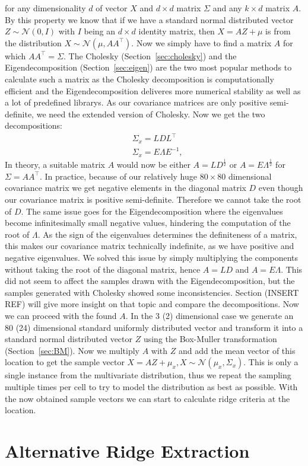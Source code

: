 \noindent for any dimensionality $d$ of vector $X$ and $d \times d$
matrix $\Sigma$ and any $k \times d$ matrix $A$. By this property we
know that if we have a standard normal distributed vector $Z \sim
\mathcal{N}(0,I)$ with $I$ being an $d \times d$ identity matrix, then
$X = AZ + \mu$ is from the distribution $X \sim \mathcal{N}(\mu, A
A^\top)$. Now we simply have to find a matrix $A$ for which $AA^\top =
\Sigma$. The Cholesky (Section~\ref{sec:cholesky}) and the
Eigendecomposition (Section~\ref{sec:eigen}) are the two most popular
methods to calculate such a matrix as the Cholesky decomposition is
computationally efficient and the Eigendecomposition deliveres more
numerical stability as well as a lot of predefined librarys. As our
covariance matrices are only positive semi-definite, we need the
extended version of Cholesky. Now we get the two decompositions:
\begin{align}
    &\Sigma_x = L D L^\top \\
    &\Sigma_x = E \Lambda E^{-1},
\end{align}
In theory, a suitable matrix $A$ would now be either $A=L
D^{\frac{1}{2}}$ or $A=E\Lambda^{\frac{1}{2}}$ for $\Sigma = AA^\top$.
In practice, because of our relatively huge $80 \times 80$ dimensional
covariance matrix we get negative elements in the diagonal matrix $D$
even though our covariance matrix is positive semi-definite. Therefore
we cannot take the root of $D$. The same issue goes for the
Eigendecomposition where the eigenvalues become infinitesimally small
negative values, hindering the computation of the root of $\Lambda$. As
the sign of the eigenvalues determines the definiteness of a matrix,
this makes our covariance matrix technically indefinite, as we have
positive and negative eigenvalues. We solved this issue by simply
multiplying the components without taking the root of the diagonal
matrix, hence $A = LD$ and $A = E \Lambda$. This did not seem to affect
the samples drawn with the Eigendecomposition, but the samples generated
with Cholesky showed some inconsistencies. Section (INSERT REF) will
give more insight on that topic and compare the decompositions. Now we
can proceed with the found $A$. In the 3 (2) dimensional  case we
generate an 80 (24) dimensional standard uniformly distributed vector
and transform it into a standard normal distributed vector $Z$ using the
Box-Muller transformation (Section~\ref{sec:BM}). Now we multiply $A$
with $Z$ and add the mean vector of this location to get the sample
vector $X = AZ + \mu_x, X \sim \mathcal{N}(\mu_x, \Sigma_x)$. This is
only a single instance from the multivariate distribution, thus we
repeat the sampling multiple times per cell to try to model the
distribution as best as possible. With the now obtained sample vectors
we can start to calculate ridge criteria at the location.

\section{Alternative Ridge Extraction}\label{sec:ridgeextract}

